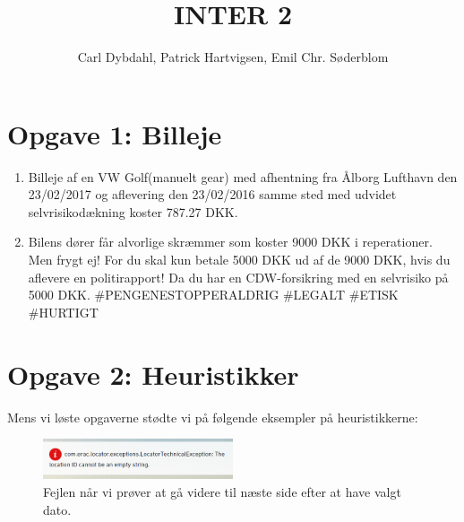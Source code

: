 \documentclass[a4paper]{article}
\title{INTER 2}
\author{Carl Dybdahl, Patrick Hartvigsen, Emil Chr. Søderblom}
\begin{document}
\maketitle

\section*{Opgave 1: Billeje}
\begin{enumerate}
\item Billeje af en VW Golf(manuelt gear) med afhentning fra Ålborg Lufthavn den 23/02/2017 og aflevering den 23/02/2016 samme sted med udvidet selvrisikodækning koster 787.27 DKK.
\item Bilens dører får alvorlige skræmmer som koster 9000 DKK i reperationer. Men frygt ej! For du skal kun betale 5000 DKK ud af de 9000 DKK, hvis du aflevere en politirapport! Da du har en CDW-forsikring med en selvrisiko på 5000 DKK. \#PENGENESTOPPERALDRIG \#LEGALT \#ETISK \#HURTIGT
\end{enumerate}

\section*{Opgave 2: Heuristikker}

Mens vi løste opgaverne stødte vi på følgende eksempler på heuristikkerne:

\begin{figure}[!ht]
\centering
\includegraphics[width=0.5\textwidth]{error0.png}
\caption{Fejlen når vi prøver at gå videre til næste side efter at have valgt dato.}
\label{error-next}
\end{figure}
\end{document}
